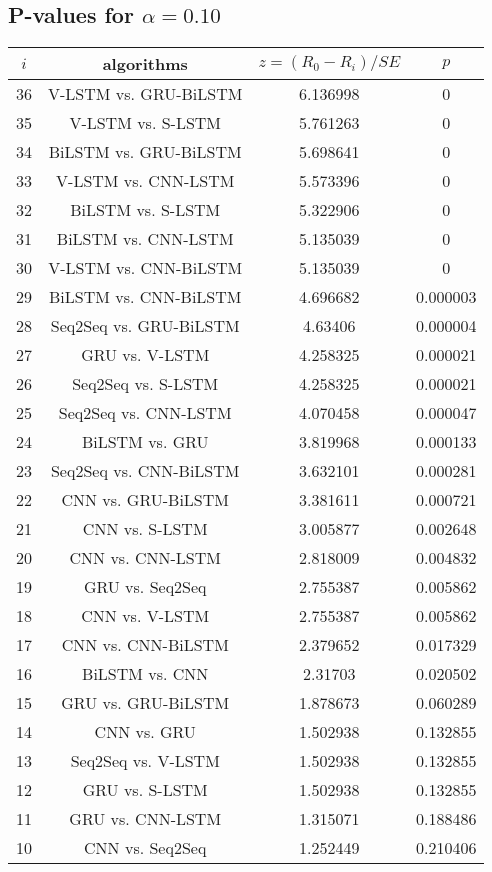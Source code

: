 \documentclass[a4paper,10pt]{article}
\begin{document}
\begin{landscape}
\subsection{P-values for $\alpha=0.10$}

\begin{table}[!htp]
\centering\scriptsize
\begin{tabular}{cccc}
$i$&algorithms&$z=(R_0 - R_i)/SE$&$p$\\
\hline36&V-LSTM vs. GRU-BiLSTM&6.136998&0\\
35&V-LSTM vs. S-LSTM&5.761263&0\\
34&BiLSTM vs. GRU-BiLSTM&5.698641&0\\
33&V-LSTM vs. CNN-LSTM&5.573396&0\\
32&BiLSTM vs. S-LSTM&5.322906&0\\
31&BiLSTM vs. CNN-LSTM&5.135039&0\\
30&V-LSTM vs. CNN-BiLSTM&5.135039&0\\
29&BiLSTM vs. CNN-BiLSTM&4.696682&0.000003\\
28&Seq2Seq vs. GRU-BiLSTM&4.63406&0.000004\\
27&GRU vs. V-LSTM&4.258325&0.000021\\
26&Seq2Seq vs. S-LSTM&4.258325&0.000021\\
25&Seq2Seq vs. CNN-LSTM&4.070458&0.000047\\
24&BiLSTM vs. GRU&3.819968&0.000133\\
23&Seq2Seq vs. CNN-BiLSTM&3.632101&0.000281\\
22&CNN vs. GRU-BiLSTM&3.381611&0.000721\\
21&CNN vs. S-LSTM&3.005877&0.002648\\
20&CNN vs. CNN-LSTM&2.818009&0.004832\\
19&GRU vs. Seq2Seq&2.755387&0.005862\\
18&CNN vs. V-LSTM&2.755387&0.005862\\
17&CNN vs. CNN-BiLSTM&2.379652&0.017329\\
16&BiLSTM vs. CNN&2.31703&0.020502\\
15&GRU vs. GRU-BiLSTM&1.878673&0.060289\\
14&CNN vs. GRU&1.502938&0.132855\\
13&Seq2Seq vs. V-LSTM&1.502938&0.132855\\
12&GRU vs. S-LSTM&1.502938&0.132855\\
11&GRU vs. CNN-LSTM&1.315071&0.188486\\
10&CNN vs. Seq2Seq&1.252449&0.210406\\

\end{tabular}
\end{table}
\end{landscape}
\end{document}
